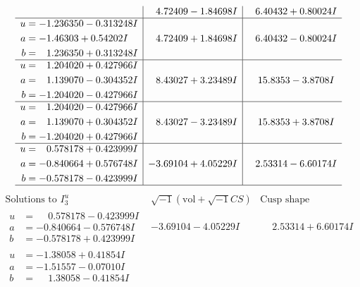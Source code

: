 \documentclass[1p]{elsarticle_modified}
\theoremstyle{definition}
\newcommand{\I}{\sqrt{-1}}
\begin{document}
$$\begin{array}{c|c|c}
 & \phantom{-}4.72409 - 1.84698 I & \phantom{-}6.40432 + 0.80024 I \\ \hline\begin{aligned}
u &= -1.236350 - 0.313248 I \\
a &= -1.46303 + 0.54202 I \\
b &= \phantom{-}1.236350 + 0.313248 I\end{aligned}
 & \phantom{-}4.72409 + 1.84698 I & \phantom{-}6.40432 - 0.80024 I \\ \hline\begin{aligned}
u &= \phantom{-}1.204020 + 0.427966 I \\
a &= \phantom{-}1.139070 - 0.304352 I \\
b &= -1.204020 - 0.427966 I\end{aligned}
 & \phantom{-}8.43027 + 3.23489 I & \phantom{-}15.8353 - 3.8708 I \\ \hline\begin{aligned}
u &= \phantom{-}1.204020 - 0.427966 I \\
a &= \phantom{-}1.139070 + 0.304352 I \\
b &= -1.204020 + 0.427966 I\end{aligned}
 & \phantom{-}8.43027 - 3.23489 I & \phantom{-}15.8353 + 3.8708 I \\ \hline\begin{aligned}
u &= \phantom{-}0.578178 + 0.423999 I \\
a &= -0.840664 + 0.576748 I \\
b &= -0.578178 - 0.423999 I\end{aligned}
 & -3.69104 + 4.05229 I & \phantom{-}2.53314 - 6.60174 I\\
 \hline 
 \end{array}$$\newpage$$\begin{array}{c|c|c}  
\text{Solutions to }I^u_{3}& \I (\text{vol} + \sqrt{-1}CS) & \text{Cusp shape}\\
 \hline 
\begin{aligned}
u &= \phantom{-}0.578178 - 0.423999 I \\
a &= -0.840664 - 0.576748 I \\
b &= -0.578178 + 0.423999 I\end{aligned}
 & -3.69104 - 4.05229 I & \phantom{-}2.53314 + 6.60174 I \\ \hline\begin{aligned}
u &= -1.38058 + 0.41854 I \\
a &= -1.51557 - 0.07010 I \\
b &= \phantom{-}1.38058 - 0.41854 I\end{aligned}

\end{array}$$
\end{document}
